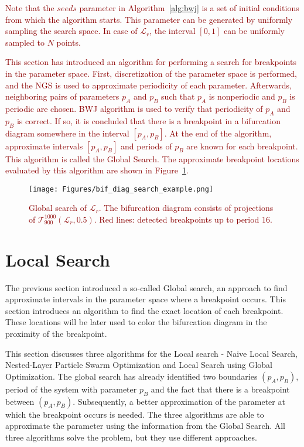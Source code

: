 \textcolor{darkred}{
Note that the $seeds$ parameter in Algorithm~\ref{alg:bwj} is a set of initial conditions from which the algorithm starts.
This parameter can be generated by uniformly sampling the search space.
In case of $\mathcal{L}_{r}$, the interval $[0, 1]$ can be uniformly sampled to $N$ points.
}

\bigskip
\textcolor{darkred}{
This section has introduced an algorithm for performing a search for breakpoints in the parameter space.
First, discretization of the parameter space is performed, and the NGS is used to approximate periodicity of each parameter.
Afterwards, neighboring pairs of parameters $p_{A}$ and $p_{B}$ such that $p_{A}$ is nonperiodic and $p_{B}$ is periodic are chosen.
BWJ algorithm is used to verify that periodicity of $p_{A}$ and $p_{B}$ is correct.
If so, it is concluded that there is a breakpoint in a bifurcation diagram somewhere in the interval $[p_{A}, p_{B}]$.
At the end of the algorithm, approximate intervals $[p_{A}, p_{B}]$ and periods of $p_{B}$ are known for each breakpoint.
This algorithm is called the Global Search.
The approximate breakpoint locations evaluated by this algorithm are shown in Figure~\ref{fig:bif_diag_search_example}.
}

\begin{figure}[!h]
    \centering
    \texttt{[image: Figures/bif\_diag\_search\_example.png]}
    \caption{
        \textcolor{darkred}{
        Global search of $\mathcal{L}_{r}$.
        The bifurcation diagram consists of projections of $\mathcal{T}_{900}^{1000}(\mathcal{L}_{r}, 0.5)$.
        Red lines: detected breakpoints up to period $16$.
        }
    }
    \label{fig:bif_diag_search_example}
\end{figure}

\section{Local Search}

The previous section introduced a so-called Global search, an approach to find approximate intervals in the parameter space where a breakpoint occurs.
This section introduces an algorithm to find the exact location of each breakpoint.
These locations will be later used to color the bifurcation diagram in the proximity of the breakpoint.
\par
This section discusses three algorithms for the Local search - Naive Local Search, Nested-Layer Particle Swarm Optimization and Local Search using Global Optimization.
The global search has already identified two boundaries $(p_A, p_B)$, period of the system with parameter $p_B$ and the fact that there is a breakpoint between $(p_A, p_B)$.
Subsequently, a better approximation of the parameter at which the breakpoint occurs is needed.
The three algorithms are able to approximate the parameter using the information from the Global Search.
All three algorithms solve the problem, but they use different approaches.


